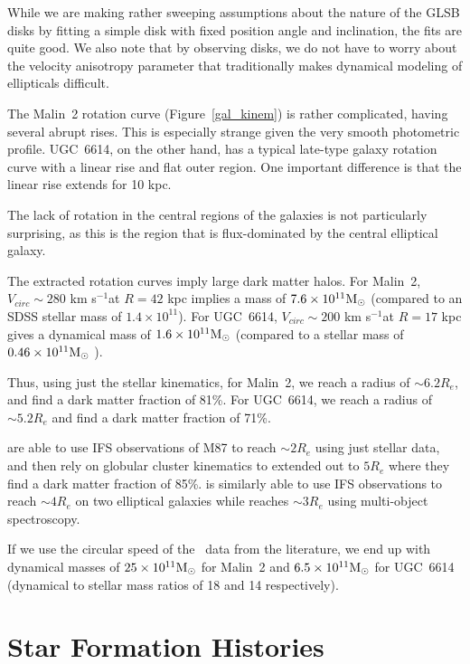 \documentclass[12pt,preprint]{aastex}
\newcommand\msun{\rm{M}_\odot}
\newcommand\kms{km s$^{-1}$}
\newcommand\HI{\ion{H}{1}}
\begin{document}
While we are making rather sweeping assumptions about the nature of the GLSB disks by fitting a simple disk with fixed position angle and inclination, the fits are quite good.
We also note that by observing disks, we do not have to worry about the velocity anisotropy parameter that traditionally makes dynamical modeling of ellipticals difficult.

The Malin~2 rotation curve (Figure~\ref{gal_kinem}) is rather complicated, having several abrupt rises.
This is especially strange given the very smooth photometric profile.
UGC~6614, on the other hand, has a typical late-type galaxy rotation curve with a linear rise and flat outer region.
One important difference is that the linear rise extends for 10 kpc.

The lack of rotation in the central regions of the galaxies is not particularly surprising, as this is the region that is flux-dominated by the central elliptical galaxy.


The extracted rotation curves imply large dark matter halos.
For Malin~2, $V_{circ}\sim 280$ \kms at $R=42$ kpc implies a mass of $7.6\times 10^{11} \msun$ (compared to an SDSS stellar mass of $1.4\times 10^{11}$).
For UGC~6614, $V_{circ}\sim 200$ \kms at $R=17$ kpc gives a dynamical mass of $1.6\times 10^{11} \msun$ (compared to a stellar mass of $0.46\times 10^{11} \msun$ ).


Thus, using just the stellar kinematics, for Malin~2, we reach a radius of $\sim 6.2 R_e$, and find a dark matter fraction of 81\%.
For UGC~6614, we reach a radius of  $\sim 5.2 R_e$ and find a dark matter fraction of 71\%.


\citet{Murphy2011} are able to use IFS observations of M87 to reach $\sim2 R_e$ using just stellar data, and then rely on globular cluster kinematics to extended out to $5 R_e$ where they find a dark matter fraction of 85\%.
\citet{Weij09} is similarly able to use IFS observations to reach $\sim 4 R_e$ on two elliptical galaxies while \citet{Proctor09} reaches $\sim 3 R_e$ using multi-object spectroscopy.



If we use the circular speed of the \HI\ data from the literature, we end up with dynamical masses of $25\times 10^{11} \msun$ for Malin~2 and $6.5\times 10^{11} \msun$ for UGC~6614 (dynamical to stellar mass ratios of 18 and 14 respectively).



\section{Star Formation Histories}\label{sec:sfh}
\end{document}

